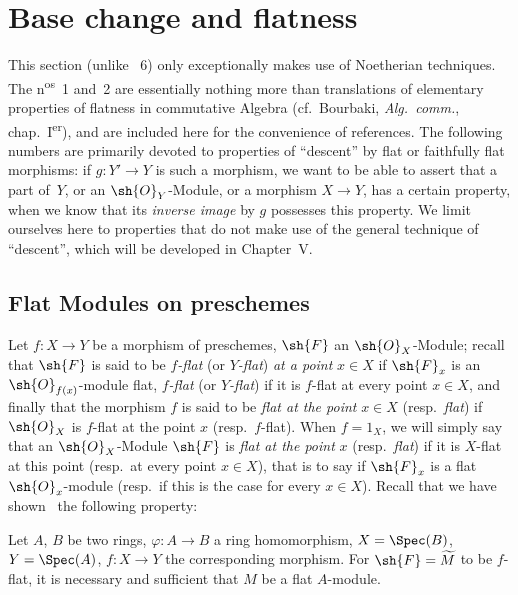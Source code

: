 \section{Base change and flatness}
\label{section:IV.2}


This section (unlike \textsection~6) only exceptionally makes use of Noetherian techniques.
The n\textsuperscript{os}~1 and~2 are essentially nothing more than translations of elementary properties of flatness in commutative Algebra (cf.~Bourbaki, \emph{Alg.~comm.}, chap.~I\textsuperscript{er}), and are included here for the convenience of references.
The following numbers are primarily devoted to properties of ``descent'' by flat or faithfully flat morphisms: if $g:Y'\to Y$ is such a morphism, we want to be able to assert that a part of~$Y$, or an $\sh{O}_Y$-Module, or a morphism $X\to Y$, has a certain property, when we know that its \emph{inverse image} by $g$ possesses this property.
We limit ourselves here to properties that do not make use of the general technique of ``descent'', which will be developed in Chapter~V.

\subsection{Flat Modules on preschemes}
\label{subsection:IV.2.1}

\begin{env}[2.1.1]
\label{IV.2.1.1}
Let $f:X\to Y$ be a morphism of preschemes, $\sh{F}$ an $\sh{O}_X$-Module;
recall~ that $\sh{F}$ is said to be \emph{$f$-flat} (or \emph{$Y$-flat}) \emph{at a point} $x\in X$ if $\sh{F}_x$ is an $\sh{O}_{f(x)}$-module flat, \emph{$f$-flat} (or \emph{$Y$-flat}) if it is $f$-flat at every point $x\in X$, and finally that the morphism $f$ is said to be \emph{flat at the point} $x\in X$ (resp.\ \emph{flat}) if $\sh{O}_X$ is $f$-flat at the point $x$ (resp.\ $f$-flat).
When $f=1_X$, we will simply say that an $\sh{O}_X$-Module $\sh{F}$ is \emph{flat at the point} $x$ (resp.\ \emph{flat}) if it is $X$-flat at this point (resp.\ at every point $x\in X$), that is to say if $\sh{F}_x$ is a flat $\sh{O}_x$-module (resp.\ if this is the case for every $x\in X$).
Recall that we have shown~ the following property:
\end{env}

\begin{proposition}[2.1.2]
\label{IV.2.1.2}
Let $A$, $B$ be two rings, $\varphi:A\to B$ a ring homomorphism, $X=\Spec(B)$, $Y=\Spec(A)$, $f:X\to Y$ the corresponding morphism.
For $\sh{F}=\widetilde{M}$ to be $f$-flat, it is necessary and sufficient that $M$ be a flat $A$-module.
\end{proposition}

